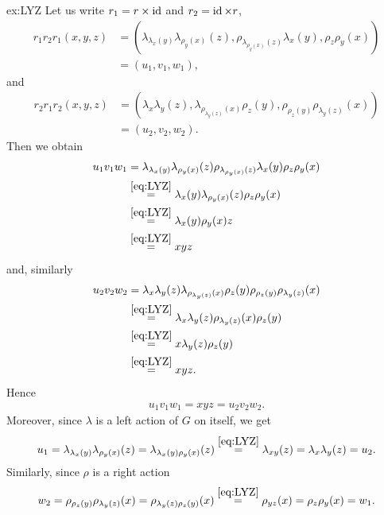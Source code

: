 \begin{sol}{ex:LYZ}
    Let us write $r_1=r\times \operatorname{id}$ and $r_2=\operatorname{id} \times r$,  
    \begin{align*}
         r_1r_2r_1(x,y,z)&= (\lambda_{\lambda_x(y)}\lambda_{\rho_y(x)}(z),\rho_{\lambda_{\rho_y(x)}(z)}\lambda_x(y),\rho_z\rho_y(x)) \\&=(u_1,v_1,w_1),
    \end{align*}
    and
    \begin{align*}
        r_2r_1r_2(x,y,z)&=(\lambda_x\lambda_y(z),\lambda_{\rho_{\lambda_y(z)}(x)}\rho_z(y),\rho_{\rho_z(y)}\rho_{\lambda_y(z)}(x))\\&=(u_2,v_2,w_2).
    \end{align*}
    Then we obtain
    \begin{align*}
        u_1v_1w_1 &= \lambda_{\lambda_x(y)}\lambda_{\rho_y(x)}(z)\rho_{\lambda_{\rho_y(x)}(z)}\lambda_x(y)\rho_z\rho_y(x)\\
        &\overset{\eqref{eq:LYZ}}{=}\lambda_x(y)\lambda_{\rho_y(x)}(z)\rho_z\rho_y(x)\\
        &\overset{\eqref{eq:LYZ}}{=}\lambda_x(y)\rho_y(x)z\\
        &\overset{\eqref{eq:LYZ}}{=}xyz
    \end{align*}
    and, similarly 
    \begin{align*}
        u_2v_2w_2 &=\lambda_x\lambda_y(z)\lambda_{\rho_{\lambda_y(z)}(x)}\rho_z(y)\rho_{\rho_z(y)}\rho_{\lambda_y(z)}(x)\\
        &\overset{\eqref{eq:LYZ}}{=}\lambda_x\lambda_y(z)\rho_{\lambda_y(z)}(x)\rho_z(y)
        \\
        &\overset{\eqref{eq:LYZ}}{=}x\lambda_y(z)\rho_z(y)\\
        &\overset{\eqref{eq:LYZ}}{=} xyz.
    \end{align*}
    Hence
    \begin{align}\label{eq:LYXproduct}
        u_1v_1w_1 =  xyz = u_2v_2w_2.
    \end{align}
    Moreover, since $\lambda$ is a left action of $G$ on itself, we  get
    \begin{align*}
        u_1=\lambda_{\lambda_x(y)}\lambda_{\rho_y(x)} (z) 
        = \lambda_{\lambda_{x}(y)\rho_y(x)}(z) 
        \overset{\eqref{eq:LYZ}}{=}\lambda_{xy}(z) = \lambda_x\lambda_y(z)=u_2.
    \end{align*}
    Similarly, since $\rho$ is a right action
    \begin{align*}
        w_2 = \rho_{\rho_z(y)}\rho_{\lambda_y(z)}(x) = \rho_{\lambda_y(z)\rho_z(y)} (x)\overset{\eqref{eq:LYZ}}{=} \rho_{yz}(x) = \rho_z\rho_y(x) = w_1.

\end{align*}
\end{sol}
